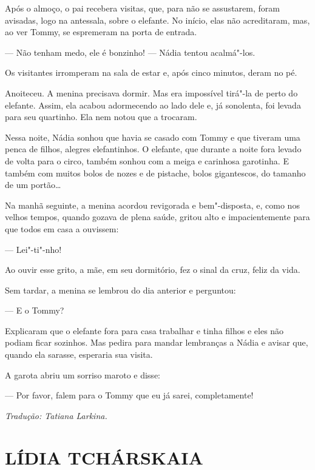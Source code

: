 Após o almoço, o pai recebera visitas, que, para não se assustarem,
foram avisadas, logo na antessala, sobre o elefante. No início, elas não
acreditaram, mas, ao ver Tommy, se espremeram na porta de entrada.

--- Não tenham medo, ele é bonzinho! --- Nádia tentou acalmá"-los.

Os visitantes irromperam na sala de estar e, após cinco minutos, deram
no pé.

Anoiteceu. A menina precisava dormir. Mas era impossível tirá"-la de
perto do elefante. Assim, ela acabou adormecendo ao lado dele e, já
sonolenta, foi levada para seu quartinho. Ela nem notou que a trocaram.

Nessa noite, Nádia sonhou que havia se casado com Tommy e que tiveram
uma penca de filhos, alegres elefantinhos. O elefante, que durante a
noite fora levado de volta para o circo, também sonhou com a meiga e
carinhosa garotinha. E também com muitos bolos de nozes e de pistache,
bolos gigantescos, do tamanho de um portão\ldots{}

Na manhã seguinte, a menina acordou revigorada e bem"-disposta, e, como
nos velhos tempos, quando gozava de plena saúde, gritou alto e
impacientemente para que todos em casa a ouvissem:

--- Lei"-ti"-nho!

Ao ouvir esse grito, a mãe, em seu dormitório, fez o sinal da cruz,
feliz da vida.

Sem tardar, a menina se lembrou do dia anterior e perguntou:

--- E o Tommy?

Explicaram que o elefante fora para casa trabalhar e tinha filhos e eles não podiam ficar sozinhos. Mas pedira para mandar lembranças
a Nádia e avisar que, quando ela sarasse, esperaria sua visita.

A garota abriu um sorriso maroto e disse:

--- Por favor, falem para o Tommy que eu já sarei, completamente!

\medskip

{\footnotesize\hfill\emph{Tradução: Tatiana Larkina.}}


\part[LÍDIA TCHÁRSKAIA]{LÍDIA TCHÁRSKAIA }

